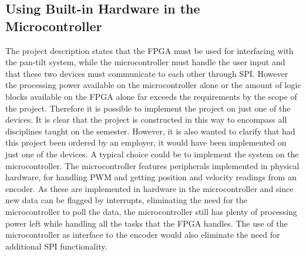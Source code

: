 \documentclass[../../main.tex]{subfiles}
\begin{document}
\subsection*{Using Built-in Hardware in the Microcontroller}
The project description states that the FPGA must be used for interfacing with the pan-tilt system, while the microcontroller must handle the user input and that these two devices must communicate to each other through SPI. However the processing power available on the microcontroller alone or the amount of logic blocks available on the FPGA alone far exceeds the requirements by the scope of the project. Therefore it is possible to implement the project on just one of the devices. It is clear that the project is constructed in this way to encompass all disciplines taught on the semester. However, it is also wanted to clarify that had this project been ordered by an employer, it would have been implemented on just one of the devices. A typical choice could be to implement the system on the microcontroller. The microcontroller features peripherals implemented in physical hardware, for handling PWM and getting position and velocity readings from an encoder. As these are implemented in hardware in the microcontroller and since new data can be flagged by interrupts, eliminating the need for the microcontroller to poll the data, the microcontroller still has plenty of processing power left while handling all the tasks that the FPGA handles. The use of the microcontroller as interface to the encoder would also eliminate the need for additional SPI functionality.

\end{document}
